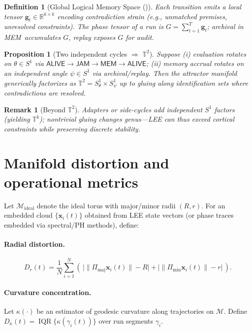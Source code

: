 \documentclass[11pt]{article}
\newtheorem{definition}{Definition}
\newtheorem{proposition}{Proposition}
\newtheorem{remark}{Remark}
\newcommand{\Alive}{\textsf{ALIVE}}
\newcommand{\Jam}{\textsf{JAM}}
\newcommand{\Mem}{\textsf{MEM}}
\newcommand{\R}{\mathbb{R}}
\newcommand{\T}{\mathbb{T}}
\newcommand{\GLMS}{\mathrm{GLMS}}
\begin{document}
\begin{definition}[Global Logical Memory Space (\GLMS)]
Each transition emits a local tensor $\bm{g}_t\in\R^{k\times k}$ encoding contradiction strain (e.g., unmatched premises, unresolved constraints).
The \emph{phase tensor} of a run is $G=\sum_{t=1}^T \bm{g}_t$; archival in \Mem\ accumulates $G$, replay exposes $G$ for audit.
\end{definition}

\begin{proposition}[Two independent cycles $\Rightarrow$ $\T^2$]\label{prop:torus}
Suppose (i) evaluation rotates on $\theta\in S^1$ via $\Alive\!\rightarrow\!\Jam\!\rightarrow\!\Mem\!\rightarrow\!\Alive$; (ii) memory accrual rotates on an independent angle $\psi\in S^1$ via archival/replay.
Then the attractor manifold generically factorizes as $\T^2=S^1_\theta\times S^1_\psi$ up to gluing along identification sets where contradictions are resolved.
\end{proposition}

\begin{remark}[Beyond $\T^2$]
Adapters or side-cycles add independent $S^1$ factors (yielding $\T^k$); nontrivial gluing changes genus—LEE can thus exceed cortical constraints while preserving discrete stability.
\end{remark}

\section{Manifold distortion and operational metrics}
Let $\mathcal{M}_\mathrm{ideal}$ denote the ideal torus with major/minor radii $(R,r)$.
For an embedded cloud $\{\mathbf{x}_i(t)\}$ obtained from LEE state vectors (or phase traces embedded via spectral/PH methods), define:

\paragraph{Radial distortion.}
\begin{equation}
D_r(t)=\frac{1}{N}\sum_{i=1}^N \left(\,\big|\|\Pi_{\mathrm{maj}}\mathbf{x}_i(t)\|-R\big|+\big|\|\Pi_{\mathrm{min}}\mathbf{x}_i(t)\|-r\big|\,\right).
\end{equation}

\paragraph{Curvature concentration.}
Let $\kappa(\cdot)$ be an estimator of geodesic curvature along trajectories on $\mathcal{M}$. Define $D_\kappa(t)=\operatorname{IQR}\{\kappa(\gamma_i(t))\}$ over run segments $\gamma_i$.
\end{document}
